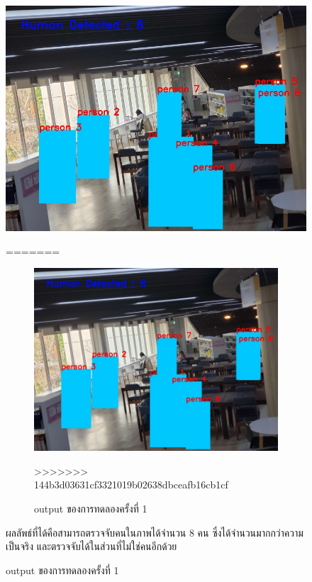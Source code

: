 \begin{figure}[h]
    \centering
    \includegraphics[scale=0.35]{images/hog_output.jpg}
    \caption[output]{output ของการทดลองครั้งที่ 1}
    \label{fig:output1}
=======
\begin{figure}[ht]
\centering
\includegraphics[scale=0.35]{images/hog_output.jpg}
\caption[output1]{output ของการทดลองครั้งที่ 1}
\label{fig:output1}
>>>>>>> 144b3d03631cf3321019b02638dbceafb16cb1cf
\end{figure}

ผลลัพธ์ที่ได้คือสามารถตรวจจับคนในภาพได้จำนวน 8 คน ซึ่งได้จำนวนมากกว่าความเป็นจริง และตรวจจับได้ในส่วนที่ไม่ใช่คนอีกด้วย


\end{figure}
